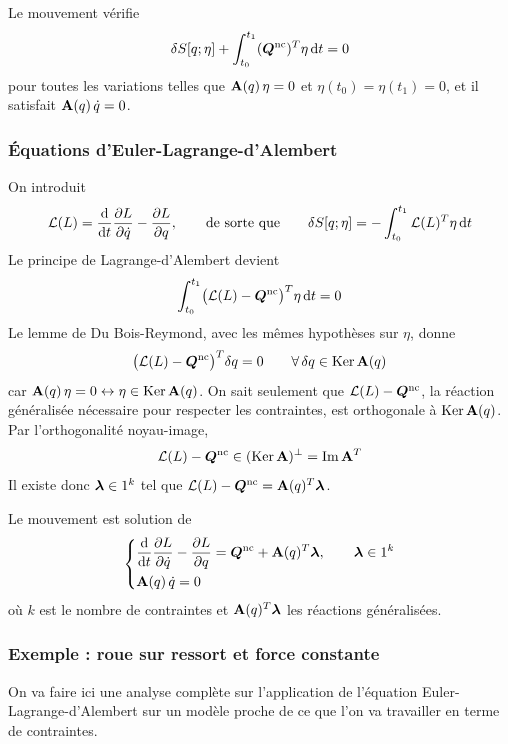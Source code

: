 \begin{theoreme}
    Le mouvement vérifie
    \[
        \delta S[q;\eta]
        + \int_{t_0}^{t_1}(\bm{Q}^{\mathrm{nc}})^T\eta\,\mathrm{d} t = 0
    \]
    pour toutes les variations telles que $\mathbf{A}(q)\,\eta = 0$ et
    $\eta(t_0) = \eta(t_1) = 0$, et il satisfait
    $\mathbf{A}(q)\,\dot q = 0$.
\end{theoreme}

\subsubsection{Équations d'Euler-Lagrange-d'Alembert}

On introduit
\[
    \mathcal{L}(L) = \frac{\mathrm{d}}{\mathrm{d} t}\frac{\partial L}{\partial \dot q} - \frac{\partial L}{\partial q},
    \qquad\text{de sorte que}\qquad
    \delta S[q;\eta] = -\int_{t_0}^{t_1}\mathcal{L}(L)^T\eta\,\mathrm{d} t
\]
Le principe de Lagrange-d'Alembert devient
\[
    \int_{t_0}^{t_1}\bigl(\mathcal{L}(L) - \bm{Q}^{\mathrm{nc}}\bigr)^T
    \eta\,\mathrm{d} t = 0
\]
Le lemme de Du Bois-Reymond, avec les mêmes hypothèses sur $\eta$,
donne
\[
    \bigl(\mathcal{L}(L) - \bm{Q}^{\mathrm{nc}}\bigr)^T\delta q = 0
    \qquad \forall\,\delta q\in\operatorname{Ker}\mathbf{A}(q)
\]
car $\mathbf{A}(q)\,\eta = 0 \leftrightarrow \eta\in\operatorname{Ker}\mathbf{A}(q)$. On
sait seulement que $\mathcal{L}(L) - \bm{Q}^{\mathrm{nc}}$, la réaction
généralisée nécessaire pour respecter les contraintes, est orthogonale
à $\operatorname{Ker}\mathbf{A}(q)$. Par l'orthogonalité noyau-image,
\[
    \mathcal{L}(L) - \bm{Q}^{\mathrm{nc}}\in(\operatorname{Ker}\mathbf{A})^\perp
    = \operatorname{Im}\mathbf{A}^T
\]
Il existe donc $\bm{\lambda}\in1^k$ tel que
$\mathcal{L}(L) - \bm{Q}^{\mathrm{nc}} = \mathbf{A}(q)^T\bm{\lambda}$.

\begin{theoreme}
    Le mouvement est solution de
    \[
        \left\{
        \begin{aligned}
            &\frac{\mathrm{d}}{\mathrm{d} t}\frac{\partial L}{\partial \dot q} - \frac{\partial L}{\partial q}
            = \bm{Q}^{\mathrm{nc}} + \mathbf{A}(q)^T\bm{\lambda},
            \qquad \bm{\lambda}\in1^k\\
            &\mathbf{A}(q)\,\dot q = 0
        \end{aligned}
        \right.
    \]
    où $k$ est le nombre de contraintes et $\mathbf{A}(q)^T\bm{\lambda}$ les
    réactions généralisées.
\end{theoreme}

\subsubsection{Exemple : roue sur ressort et force constante}
On va faire ici une analyse complète sur l'application de l'équation Euler-Lagrange-d'Alembert sur un modèle proche de ce que l'on va travailler en terme de contraintes.

